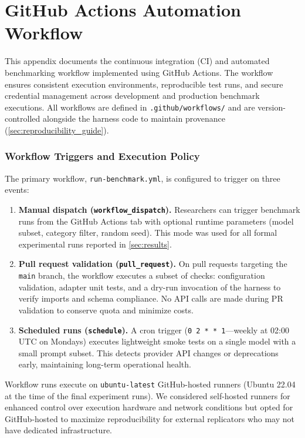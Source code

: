 \section{GitHub Actions Automation Workflow}\label{app:github_actions_workflow}

This appendix documents the continuous integration (CI) and automated benchmarking workflow implemented using GitHub Actions. The workflow ensures consistent execution environments, reproducible test runs, and secure credential management across development and production benchmark executions. All workflows are defined in \texttt{.github/workflows/} and are version-controlled alongside the harness code to maintain provenance (\cref{sec:reproducibility_guide}).

\subsubsection{Workflow Triggers and Execution Policy}

The primary workflow, \texttt{run-benchmark.yml}, is configured to trigger on three events:

\begin{enumerate}
\item \textbf{Manual dispatch (\texttt{workflow\_dispatch}).} Researchers can trigger benchmark runs from the GitHub Actions tab with optional runtime parameters (model subset, category filter, random seed). This mode was used for all formal experimental runs reported in \cref{sec:results}.
\item \textbf{Pull request validation (\texttt{pull\_request}).} On pull requests targeting the \texttt{main} branch, the workflow executes a subset of checks: configuration validation, adapter unit tests, and a dry-run invocation of the harness to verify imports and schema compliance. No API calls are made during PR validation to conserve quota and minimize costs.
\item \textbf{Scheduled runs (\texttt{schedule}).} A cron trigger (\texttt{0 2 * * 1}—weekly at 02:00 UTC on Mondays) executes lightweight smoke tests on a single model with a small prompt subset. This detects provider API changes or deprecations early, maintaining long-term operational health.
\end{enumerate}

Workflow runs execute on \texttt{ubuntu-latest} GitHub-hosted runners (Ubuntu 22.04 at the time of the final experiment runs). We considered self-hosted runners for enhanced control over execution hardware and network conditions but opted for GitHub-hosted to maximize reproducibility for external replicators who may not have dedicated infrastructure.

